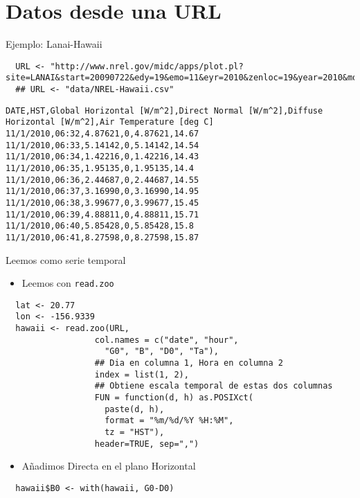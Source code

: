 \documentclass[xcolor={usenames,svgnames,dvipsnames}]{beamer}
\begin{document}
\section{Datos desde una URL}
\label{sec-4}
\begin{frame}[fragile,label=sec-4-1]{Ejemplo: Lanai-Hawaii}
 \lstset{language=R,label= ,caption= ,numbers=none}
\begin{lstlisting}
  URL <- "http://www.nrel.gov/midc/apps/plot.pl?site=LANAI&start=20090722&edy=19&emo=11&eyr=2010&zenloc=19&year=2010&month=11&day=1&endyear=2010&endmonth=11&endday=19&time=1&inst=3&inst=4&inst=5&inst=10&type=data&first=3&math=0&second=-1&value=0.0&global=-1&direct=-1&diffuse=-1&user=0&axis=1"
  ## URL <- "data/NREL-Hawaii.csv"
\end{lstlisting}

\begin{verbatim}
DATE,HST,Global Horizontal [W/m^2],Direct Normal [W/m^2],Diffuse Horizontal [W/m^2],Air Temperature [deg C]
11/1/2010,06:32,4.87621,0,4.87621,14.67
11/1/2010,06:33,5.14142,0,5.14142,14.54
11/1/2010,06:34,1.42216,0,1.42216,14.43
11/1/2010,06:35,1.95135,0,1.95135,14.4
11/1/2010,06:36,2.44687,0,2.44687,14.55
11/1/2010,06:37,3.16990,0,3.16990,14.95
11/1/2010,06:38,3.99677,0,3.99677,15.45
11/1/2010,06:39,4.88811,0,4.88811,15.71
11/1/2010,06:40,5.85428,0,5.85428,15.8
11/1/2010,06:41,8.27598,0,8.27598,15.87
\end{verbatim}
\end{frame}

\begin{frame}[fragile,label=sec-4-2]{Leemos como serie temporal}
 \begin{itemize}
\item Leemos con \texttt{read.zoo}
\end{itemize}
\lstset{language=R,label= ,caption= ,numbers=none}
\begin{lstlisting}
  lat <- 20.77
  lon <- -156.9339
  hawaii <- read.zoo(URL,
                  col.names = c("date", "hour",
                    "G0", "B", "D0", "Ta"),
                  ## Dia en columna 1, Hora en columna 2
                  index = list(1, 2),
                  ## Obtiene escala temporal de estas dos columnas
                  FUN = function(d, h) as.POSIXct(
                    paste(d, h),
                    format = "%m/%d/%Y %H:%M",
                    tz = "HST"), 
                  header=TRUE, sep=",")
\end{lstlisting}
\begin{itemize}
\item Añadimos Directa en el plano Horizontal
\end{itemize}
\lstset{language=R,label= ,caption= ,numbers=none}
\begin{lstlisting}
  hawaii$B0 <- with(hawaii, G0-D0)
\end{lstlisting}
\end{frame}
\end{document}
